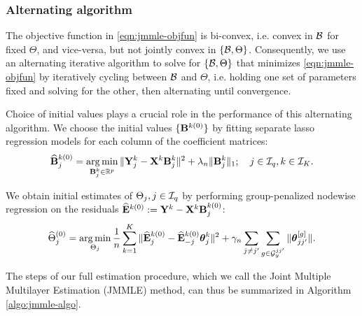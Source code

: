 \subsubsection{Alternating algorithm}
The objective function in \eqref{eqn:jmmle-objfun} is bi-convex, i.e. convex in ${\cal{B}}$ for fixed $\Theta$, and vice-versa, but not jointly convex in $\{ {\cal{B}}, \Theta \}$. Consequently, we use an alternating iterative algorithm to solve for $\{ {\cal{B}}, \Theta \}$ that minimizes \eqref{eqn:jmmle-objfun} by iteratively cycling between ${\cal{B}}$ and $\Theta$, i.e. holding one set of parameters fixed and solving for the other, then alternating until convergence.

Choice of initial values plays a crucial role in the performance of this alternating algorithm.%
%
%
We choose the initial values $\{ {\mathbf{B}}^{k (0)} \}$ by fitting separate lasso regression models for each column of the coefficient matrices:
%
\begin{align}\label{eqn:init-B}
\widehat {{\mathbf{B}}}_j^{k (0)} = \operatorname*{arg\,min}_{{\mathbf{B}}_j^k \in {\mathbb{R}}^p} \|{\mathbf{Y}}_j^k - {\mathbf{X}}^k {\mathbf{B}}_j^k \|^2 + \lambda_n \| {\mathbf{B}}_j^k \|_1; \quad
j \in {\cal{I}}_q, k \in {\cal{I}}_K.
\end{align}
%

We obtain initial estimates of $ \Theta_j, j \in {\cal{I}}_q$ by performing group-penalized nodewise regression on the residuals $\widehat {{\mathbf{E}}}^{k (0)} := {\mathbf{Y}}^k - {\mathbf{X}}^k {\mathbf{B}}_j^{k (0)}$:
%
\begin{align}\label{eqn:init-Theta}
\widehat \Theta_j^{(0)} = \operatorname*{arg\,min}_{\Theta_j} \frac{1}{n} \sum_{k=1}^K \|
\widehat {{\mathbf{E}}}_j^{k (0)} - \widehat {{\mathbf{E}}}_{-j}^{k (0)} {\boldsymbol{\theta}}_j^k \|^2
+ \gamma_n \sum_{j \neq j'} \sum_{g \in {\cal{G}}_y^{jj'}} \| {\boldsymbol{\theta}}_{jj'}^{[g]} \|.
\end{align}

The steps of our full estimation procedure, which we call the Joint Multiple Multilayer Estimation (JMMLE) method, can thus be summarized in Algorithm \ref{algo:jmmle-algo}.


